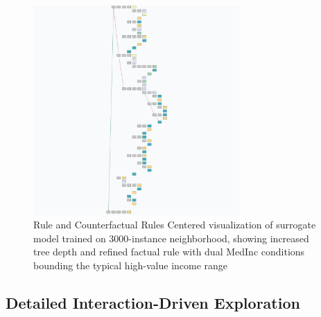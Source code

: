 \begin{figure}[ht]
\centering
\includegraphics[width=0.7\textwidth]{images/ds_tree_3000.png}
\caption{Rule and Counterfactual Rules Centered visualization of surrogate model trained on 3000-instance neighborhood, showing increased tree depth and refined factual rule with dual MedInc conditions bounding the typical high-value income range}
\label{fig:ds_tree_3000}
\end{figure}

\subsection{Detailed Interaction-Driven Exploration}

